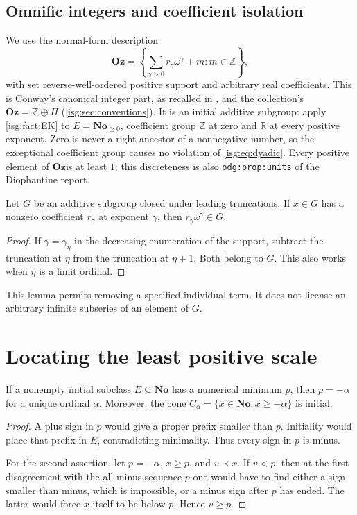 \documentclass[11pt]{article}
\theoremstyle{definition}
\theoremstyle{remark}
\newcommand{\No}{\ensuremath{\mathbf{No}}}
\newcommand{\Oz}{\ensuremath{\mathbf{Oz}}}
\newcommand{\R}{\mathbb{R}}
\newcommand{\Z}{\mathbb{Z}}
\newcommand{\pr}{\mathrel{\prec}}
\newcommand{\replabel}[1]{\nolinkurl{#1}}
\begin{document}
\subsection{Omnific integers and coefficient isolation}
We use the normal-form description
\begin{equation}\label{isg:eq:Oz}
 \Oz=\left\{\sum_{\gamma>0}r_\gamma\omega^\gamma+m:
           m\in\Z\right\},
\end{equation}
with set reverse-well-ordered positive support and arbitrary real
coefficients. This is Conway's canonical integer part, as recalled in
\cite[Section~6.2]{Kaplan}, and the collection's $\Oz=\Z\oplus\Pi$
(\cref{isg:sec:conventions}). It is an initial additive subgroup: apply
\cref{isg:fact:EK} to $E=\No_{\ge0}$, coefficient group $\Z$ at zero and
$\R$ at every positive exponent. Zero is never a right ancestor of a
nonnegative number, so the exceptional coefficient group causes no
violation of \eqref{isg:eq:dyadic}. Every positive element of \Oz is at
least $1$; this discreteness is also \replabel{odg:prop:units} of the
Diophantine report.

\begin{lemma}\label{isg:lem:isolate}
Let $G$ be an additive subgroup closed under leading truncations. If
$x\in G$ has a nonzero coefficient $r_\gamma$ at exponent $\gamma$,
then $r_\gamma\omega^\gamma\in G$.
\end{lemma}
\begin{proof}
If $\gamma=\gamma_\eta$ in the decreasing enumeration of the support,
subtract the truncation at $\eta$ from the truncation at $\eta+1$.
Both belong to $G$. This also works when $\eta$ is a limit ordinal.
\end{proof}

This lemma permits removing a specified individual term. It does not
license an arbitrary infinite subseries of an element of $G$.

\section{Locating the least positive scale}\label{isg:sec:bottom}

\begin{lemma}\label{isg:lem:min-tree}
If a nonempty initial subclass $E\subseteq\No$ has a numerical minimum
$p$, then $p=-\alpha$ for a unique ordinal $\alpha$.
Moreover, the cone $C_\alpha=\{x\in\No:x\ge-\alpha\}$ is initial.
\end{lemma}
\begin{proof}
A plus sign in $p$ would give a proper prefix smaller than $p$.
Initiality would place that prefix in $E$, contradicting minimality.
Thus every sign in $p$ is minus.

For the second assertion, let $p=-\alpha$, $x\ge p$, and $v\pr x$.
If $v<p$, then at the first disagreement with the all-minus sequence $p$
one would have to find either a sign smaller than minus, which is
impossible, or a minus sign after $p$ has ended. The latter would force
$x$ itself to be below $p$. Hence $v\ge p$.
\end{proof}
\end{document}
